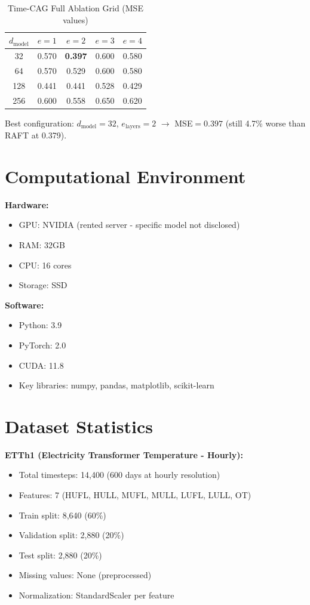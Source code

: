 \documentclass[10pt,twocolumn,letterpaper]{article}
\begin{document}
\begin{table}[h]
\centering
\caption{Time-CAG Full Ablation Grid (MSE values)}
\label{tab:full_ablation}
\small
\begin{tabular}{ccccc}
\toprule
\textbf{$d_{\text{model}}$} & \textbf{$e=1$} & \textbf{$e=2$} & \textbf{$e=3$} & \textbf{$e=4$} \\
\midrule
32 & 0.570 & \textbf{0.397} & 0.600 & 0.580 \\
64 & 0.570 & 0.529 & 0.600 & 0.580 \\
128 & 0.441 & 0.441 & 0.528 & 0.429 \\
256 & 0.600 & 0.558 & 0.650 & 0.620 \\
\bottomrule
\end{tabular}
\end{table}

\noindent Best configuration: $d_{\text{model}}=32$, $e_{\text{layers}}=2$ $\rightarrow$ MSE$=0.397$ (still 4.7\% worse than RAFT at 0.379).

\section{Computational Environment}

\noindent\textbf{Hardware:}
\begin{itemize}
    \item GPU: NVIDIA (rented server - specific model not disclosed)
    \item RAM: 32GB
    \item CPU: 16 cores
    \item Storage: SSD
\end{itemize}

\noindent\textbf{Software:}
\begin{itemize}
    \item Python: 3.9
    \item PyTorch: 2.0
    \item CUDA: 11.8
    \item Key libraries: numpy, pandas, matplotlib, scikit-learn
\end{itemize}

\section{Dataset Statistics}

\noindent\textbf{ETTh1 (Electricity Transformer Temperature - Hourly):}
\begin{itemize}
    \item Total timesteps: 14,400 (600 days at hourly resolution)
    \item Features: 7 (HUFL, HULL, MUFL, MULL, LUFL, LULL, OT)
    \item Train split: 8,640 (60\%)
    \item Validation split: 2,880 (20\%)
    \item Test split: 2,880 (20\%)
    \item Missing values: None (preprocessed)
    \item Normalization: StandardScaler per feature
\end{itemize}
\end{document}
